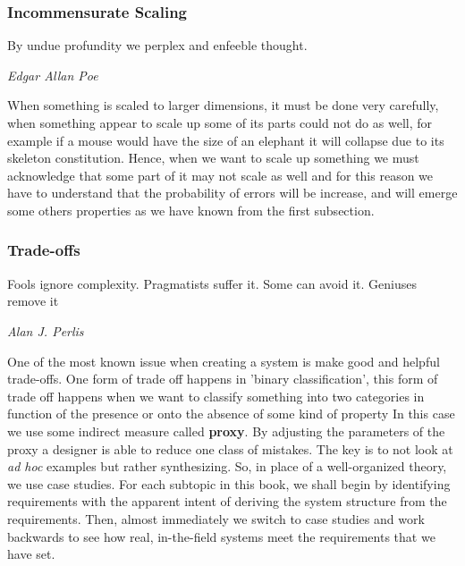 \documentclass{article}
\begin{document}
  \subsubsection{Incommensurate Scaling}
    \epigraph{By undue profundity we perplex and enfeeble thought.}{\textit{Edgar Allan Poe}}
    When something is scaled to larger dimensions, it must be done very carefully, when something appear to scale up some of its parts could not do as well,
    for example if a mouse would have the size of an elephant it will collapse due to its skeleton constitution. Hence, when we want to scale up something we 
    must acknowledge that some part of it may not scale as well and for this reason we have to understand that the probability of errors will be 
    increase, and will emerge some others properties as we have known from the first subsection.
  \subsubsection{Trade-offs}
    \epigraph{Fools ignore complexity. Pragmatists suffer it. Some can avoid it. Geniuses remove it}{\textit{Alan J. Perlis}}
    One of the most known issue when creating a system is make good and helpful trade-offs. One form of trade off happens in 'binary classification', this
    form of trade off happens when we want to classify something into two categories in function of the presence or onto the absence of some kind of property 
    In this case we use some indirect measure called \textbf{proxy}. By adjusting the parameters of the proxy a designer is able to reduce one class
    of mistakes. The key is to not look at \textit{ad hoc} examples but rather synthesizing. So, in place of a well-organized theory, we use case studies. For each subtopic 
    in this book, we shall begin by identifying requirements with the apparent intent 
    of deriving the system structure from the requirements. Then, almost immediately 
    we switch to case studies and work backwards to see how real, in-the-field systems 
    meet the requirements that we have set.
\end{document}
